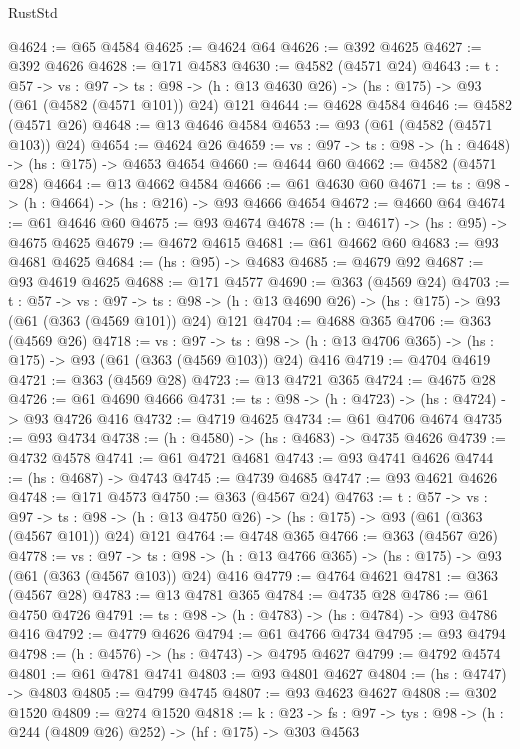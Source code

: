 \begin{lexlean}{RustStd}
\begin{coremodule}
@4624 := @65 @4584
@4625 := @4624 @64
@4626 := @392 @4625
@4627 := @392 @4626
@4628 := @171 @4583
@4630 := @4582 (@4571 @24)
@4643 := {t : @57} ->
  {vs : @97} ->
  {ts : @98} -> (h : @13 @4630 @26) -> (hs : @175) -> @93 (@61 (@4582 (@4571 @101)) @24) @121
@4644 := @4628 @4584
@4646 := @4582 (@4571 @26)
@4648 := @13 @4646 @4584
@4653 := @93 (@61 (@4582 (@4571 @103)) @24)
@4654 := @4624 @26
@4659 := {vs : @97} -> {ts : @98} -> (h : @4648) -> (hs : @175) -> @4653 @4654
@4660 := @4644 @60
@4662 := @4582 (@4571 @28)
@4664 := @13 @4662 @4584
@4666 := @61 @4630 @60
@4671 := {ts : @98} -> (h : @4664) -> (hs : @216) -> @93 @4666 @4654
@4672 := @4660 @64
@4674 := @61 @4646 @60
@4675 := @93 @4674
@4678 := (h : @4617) -> (hs : @95) -> @4675 @4625
@4679 := @4672 @4615
@4681 := @61 @4662 @60
@4683 := @93 @4681 @4625
@4684 := (hs : @95) -> @4683
@4685 := @4679 @92
@4687 := @93 @4619 @4625
@4688 := @171 @4577
@4690 := @363 (@4569 @24)
@4703 := {t : @57} ->
  {vs : @97} ->
  {ts : @98} -> (h : @13 @4690 @26) -> (hs : @175) -> @93 (@61 (@363 (@4569 @101)) @24) @121
@4704 := @4688 @365
@4706 := @363 (@4569 @26)
@4718 := {vs : @97} ->
  {ts : @98} -> (h : @13 @4706 @365) -> (hs : @175) -> @93 (@61 (@363 (@4569 @103)) @24) @416
@4719 := @4704 @4619
@4721 := @363 (@4569 @28)
@4723 := @13 @4721 @365
@4724 := @4675 @28
@4726 := @61 @4690 @4666
@4731 := {ts : @98} -> (h : @4723) -> (hs : @4724) -> @93 @4726 @416
@4732 := @4719 @4625
@4734 := @61 @4706 @4674
@4735 := @93 @4734
@4738 := (h : @4580) -> (hs : @4683) -> @4735 @4626
@4739 := @4732 @4578
@4741 := @61 @4721 @4681
@4743 := @93 @4741 @4626
@4744 := (hs : @4687) -> @4743
@4745 := @4739 @4685
@4747 := @93 @4621 @4626
@4748 := @171 @4573
@4750 := @363 (@4567 @24)
@4763 := {t : @57} ->
  {vs : @97} ->
  {ts : @98} -> (h : @13 @4750 @26) -> (hs : @175) -> @93 (@61 (@363 (@4567 @101)) @24) @121
@4764 := @4748 @365
@4766 := @363 (@4567 @26)
@4778 := {vs : @97} ->
  {ts : @98} -> (h : @13 @4766 @365) -> (hs : @175) -> @93 (@61 (@363 (@4567 @103)) @24) @416
@4779 := @4764 @4621
@4781 := @363 (@4567 @28)
@4783 := @13 @4781 @365
@4784 := @4735 @28
@4786 := @61 @4750 @4726
@4791 := {ts : @98} -> (h : @4783) -> (hs : @4784) -> @93 @4786 @416
@4792 := @4779 @4626
@4794 := @61 @4766 @4734
@4795 := @93 @4794
@4798 := (h : @4576) -> (hs : @4743) -> @4795 @4627
@4799 := @4792 @4574
@4801 := @61 @4781 @4741
@4803 := @93 @4801 @4627
@4804 := (hs : @4747) -> @4803
@4805 := @4799 @4745
@4807 := @93 @4623 @4627
@4808 := @302 @1520
@4809 := @274 @1520
@4818 := {k : @23} ->
  {fs : @97} -> {tys : @98} -> (h : @244 (@4809 @26) @252) -> (hf : @175) -> @303 @4563

\end{coremodule}
\end{lexlean}
